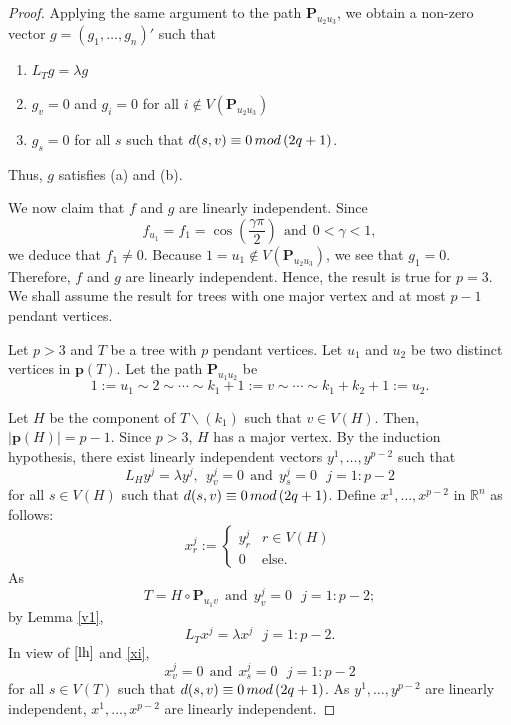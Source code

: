 \documentclass[10pt,a4paper]{amsart}
\def\pt{\mathbf{p}}
\newcommand{\p}{{\mathbf{P}}}
\begin{document}
\begin{proof}
Applying the same argument to the path $\p_{u_2u_3}$,
we obtain a non-zero vector $g=(g_1,\dotsc,g_n)'$ such that
\begin{enumerate}
\item[(i)] $L_Tg=\lambda g$ 
\item[(ii)] $g_v=0$ and $g_i=0$ for all $i\notin V(\p_{u_2u_3})$ 
\item[(iii)] $g_s=0$ for all $s$ such that
$d(s,v)\equiv 0\,{\rm{mod}}\,(2q+1)$.
\end{enumerate}
Thus, $g$ satisfies (a) and (b).

We now claim that $f$ and $g$ are linearly independent.
Since
\[f_{u_1}=f_1=\cos\left(\frac{\gamma \pi}{2} \right) ~~\mbox{and} ~~0<\gamma<1,\]
we deduce that $f_1 \neq 0$.
Because
 $1=u_1 \notin V(\p_{u_2u_3})$, we see that
$g_1=0$.
Therefore, $f$ and $g$ are linearly independent.
Hence, the result is true for $p=3$.
We shall assume the result for trees with one major vertex and at most $p-1$ pendant vertices. 

Let $p>3$ and
$T$ be a tree with
$p$ pendant vertices. Let $u_1$ and $u_2$ be two distinct vertices in $\pt(T)$. Let the path $\p_{u_1u_2}$ be 
\[1:=u_1 \sim 2 \sim  \cdots \sim k_1+1:=v \sim \cdots \sim k_1+k_2+1:=u_2.\] 




Let $H$ be the component of $T\smallsetminus ({k_1})$ such that $v\in V(H)$. 
Then, $|\pt(H)|=p-1$. 
Since $p>3$, $H$ has a major vertex. 
By the induction hypothesis,
there exist linearly independent vectors $y^1,\dots,y^{p-2}$ such that
\begin{equation} \label{lh}
L_Hy^j=\lambda y^j,~~y^{j}_v=0~~\mbox{and}~~y^{j}_s=0~~~j=1:p-2
\end{equation}
for all $s \in V(H)$ such that
$d(s,v)\equiv 0\,{\rm{mod}}\,(2q+1)$.
Define $x^1,\dots,x^{p-2}$ in $\mathbb{R}^n$ as follows:
\begin{equation}\label{xi}
x^j_r:=
\begin{cases}
y^j_r & r\in V(H) \\
0 & \mbox{else.}
\end{cases}    
\end{equation}
As \[T=H\circ \p_{u_1v}~~\mbox{and}~~
y^j_v=0 ~~~ j=1:p-2;\] 
by Lemma \ref{v1}, 
\[L_T x^j=\lambda x^j~~~j=1:p-2.\]
In view of $\eqref{lh}$ and \eqref{xi},
\[x^j_v=0 ~~\mbox{and}~~x^j_s=0~~~j=1:p-2\]
for all $s\in V(T)$
such that $d(s,v) \equiv 0\,{\rm{mod}}\,(2q+1)$.
As $y^1,\dotsc,y^{p-2}$ are 
linearly independent, $x^1,\dotsc,x^{p-2}$
are linearly independent.


\end{proof}
\end{document}
